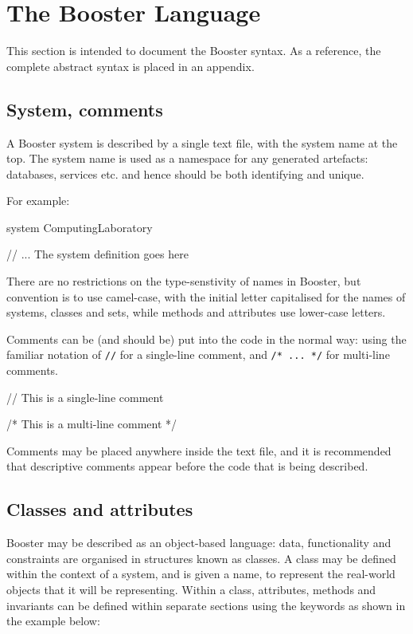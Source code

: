 \chapter{The Booster Language}

This section is intended to document the Booster syntax.  As a
reference, the complete abstract syntax is placed in an appendix.

\section{System, comments}
A Booster system is described by a single text file, with the system
name at the top.  The system name is used as a namespace for any
generated artefacts: databases, services etc. and hence should be both
identifying and unique.

For example:

\begin{code}
system ComputingLaboratory

// ... The system definition goes here
\end{code}

There are no restrictions on the type-senstivity of names in
Booster, but convention is to use camel-case, with the initial letter
capitalised for the names of systems, classes and sets, while methods
and attributes use lower-case letters.

Comments can be (and should be) put into the code in the normal way:
using the familiar notation of \verb|//| for a single-line comment,
and \verb|/* ... */| for multi-line comments.

\begin{code}
// This is a single-line comment

/* This is a multi-line 
comment */
\end{code}

Comments may be placed anywhere inside the text file, and it is
recommended that descriptive comments appear before the code that is
being described.


\section{Classes and attributes}
\label{sec:language-classes}

Booster may be described as an object-based language: data,
functionality and constraints are organised in structures known as
classes.  A class may be defined within the context of a system, and
is given a name, to represent the real-world objects that it will be
representing.  Within a class, attributes, methods and invariants can
be defined within separate sections using the keywords as shown in the
example below:

